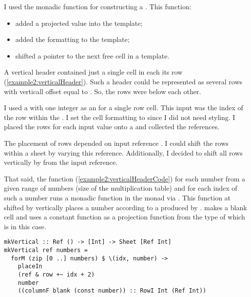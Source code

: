 I used the monadic function  for constructing a . This function:
\begin{itemize}
  \item added a projected value into the template;
  \item added the formatting to the template;
  \item shifted a pointer to the next free cell in a template.
\end{itemize}

A vertical header contained just a single cell in each its row (\cref{example2:verticalHeader}). Such a header could be represented as several rows with verticall offset equal to . So, the rows were below each other.

I used a  with one integer as an  for a single row cell. This input was the index of the row within the \vh. I set the cell formatting to  since I did not need styling. I placed the rows for each input value onto a  and collected the references.

The placement of rows depended on input reference . I could shift the rows within a sheet by varying this reference. Additionally, I decided to shift all rows vertically by  from the input reference.

That said, the function  (\cref{example2:verticalHeaderCode}) for each number from a given range of numbers (size of the multiplication table) and for each index of such a number runs a monadic function in the  monad via . This function  at  shifted by  vertically places a number according to a  produced by .  makes a blank cell and uses a constant function as a projection function from the  type of  which is  in this case.

\begin{listing}[!h]
  \begin{verbatim}
mkVertical :: Ref () -> [Int] -> Sheet [Ref Int]
mkVertical ref numbers =
  forM (zip [0 ..] numbers) $ \(idx, number) ->
    placeIn
    (ref & row +~ idx + 2)
    number
    ((columnF blank (const number)) :: RowI Int (Ref Int))
\end{verbatim}
  \caption{\vh}
  \label{example2:verticalHeaderCode}
\end{listing}

\subsubsection{\hh}
\label{example2:horizontalHeaderSection}

